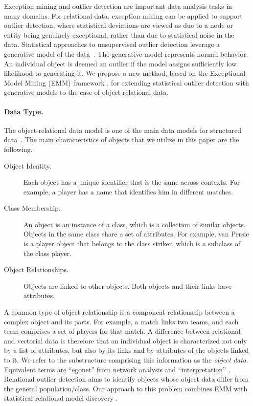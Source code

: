 {Exception mining and outlier detection are important data analysis tasks in many domains. For relational data, exception mining can be applied to support outlier detection, where statistical deviations are viewed as due to a node or entity being genuinely exceptional, rather than due to statistical noise in the data. Statistical approaches to unsupervised outlier detection leverage a generative model of the data~\cite{aggarwal2013}. The generative model represents normal behavior. An individual object is deemed an outlier if  the model assigns sufficiently low likelihood to generating it. 
We propose a new method, based on the Exceptional Model Mining (EMM) framework \cite{Duivesteijn2016}, for extending statistical  outlier detection with generative models to the case of object-relational data. 



\paragraph{Data Type.} The object-relational data model is one of the main data models for structured data~\cite{Koller1997}. The main 
characteristics of objects that we utilize in this paper are the following. 

\begin{description}
\item[Object Identity.] Each object has a unique identifier that is the same across contexts. For example, a player has a name that identifies him in different matches. 
\item[Class Membership.] An object is an instance of a class, which is a collection of similar objects. Objects in the same class share a set of attributes. For example, van Persie is a player object that belongs to the class striker, which is a subclass of the  class player.
\item[Object Relationships.] Objects are linked  to other objects. Both objects and their links have attributes. 
\end{description}


A common type of object relationship is a component relationship between a complex object and its parts.
For example, a match links two teams, and each team comprises a set of players for that match. A difference between relational and vectorial data is therefore that an individual object is characterized not only by a list of attributes, but also by its links and by attributes of the objects linked to it. We refer to the substructure comprising this information as the {\em object data}. Equivalent terms are ``egonet'' from network analysis \cite{Akoglu2015} and ``interpretation'' \cite{Maervoet2012}. Relational outlier detection aims to identify objects whose object data differ from the general population/class. Our approach to this problem combines EMM with statistical-relational model discovery \cite{SRL2007}.

}
